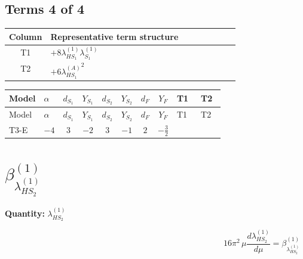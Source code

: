 \documentclass[8pt]{article}
\begin{document}
\begin{landscape}
\subsection*{Terms 4 of 4}
\begin{center}
\begin{tabular}{@{}c >{\raggedright\arraybackslash}p{0.82\linewidth}@{}}
\toprule
Column & Representative term structure \\
\midrule
T1 & \(\displaystyle +8 {\lambda_{HS_1}^{(1)}} {\lambda_{S_1}^{(1)}}\) \\
\midrule
T2 & \(\displaystyle +6 {\lambda_{HS_1}^{(A)}}^2\) \\
\midrule
\bottomrule
\end{tabular}
\end{center}
\smallskip
\tiny
\begin{longtable}{@{}llcccccc >{\raggedright\arraybackslash}p{0.21\linewidth} >{\raggedright\arraybackslash}p{0.21\linewidth}@{}}
\toprule
Model & $\alpha$ & $d_{S_1}$ & $Y_{S_1}$ & $d_{S_2}$ & $Y_{S_2}$ & $d_F$ & $Y_F$ & T1 & T2 \\
\midrule
\endfirsthead
\toprule
Model & $\alpha$ & $d_{S_1}$ & $Y_{S_1}$ & $d_{S_2}$ & $Y_{S_2}$ & $d_F$ & $Y_F$ & T1 & T2 \\
\midrule
\endhead
T3-E & $-4$ & $3$ & $-2$ & $3$ & $-1$ & $2$ & $-\frac{3}{2}$ & \scriptsize\adjustbox{max width=\linewidth}{$\begin{gathered} +8 {\lambda_{HS_1}^{(1)}} {\lambda_{S_1}^{(1)}}\end{gathered}$} & \scriptsize\adjustbox{max width=\linewidth}{$\begin{gathered} +6 {\lambda_{HS_1}^{(A)}}^2\end{gathered}$} \\
\midrule
\bottomrule
\end{longtable}
\clearpage
\section*{$\beta_{\lambda_{HS_2}^{(1)}}^{(1)}$}
\noindent\textbf{Quantity: }$\lambda_{HS_2}^{(1)}$\par\smallskip
\[16\pi^2\,\mu\frac{d \lambda_{HS_2}^{(1)}}{d\mu}=\beta_{\lambda_{HS_2}^{(1)}}^{(1)}\]

\end{landscape}
\end{document}
